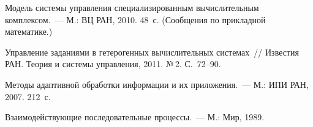\begin{multicols}{2}
{{\begin{thebibliography}{9}
    Модель системы управления специализированным вычислительным 
комплексом.~--- М.: ВЦ РАН, 2010. 48~с. (Сообщения по прикладной 
математике.)
  
  Управ\-ле\-ние заданиями в гетерогенных вычислительных системах~// Известия 
РАН. Теория и системы управ\-ле\-ния, 2011. №\,2. С.~72--90.
    
    
    Методы адаптивной обработки информации и их приложения.~--- М.: ИПИ 
РАН, 2007. 212~с.

\label{end\stat}
    
    Взаимодействующие последовательные процессы.~--- М.: Мир, 1989.
 \end{thebibliography}
}
}


\end{multicols}
    